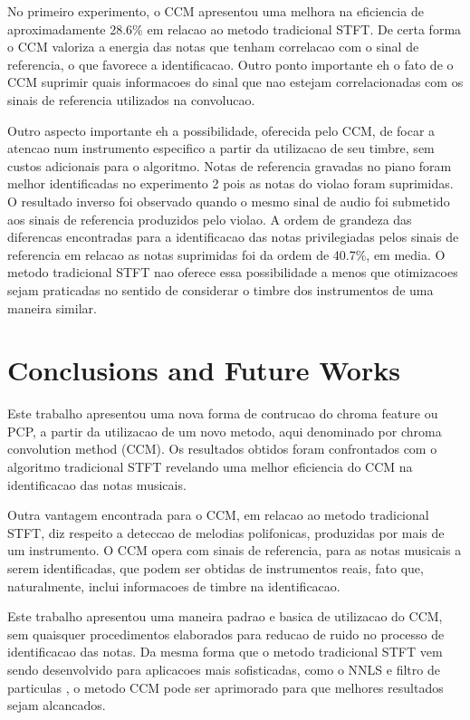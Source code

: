 \documentclass{article}
\begin{document}
	No primeiro experimento, o CCM apresentou uma melhora na eficiencia de aproximadamente 28.6\% em relacao ao metodo tradicional STFT. De certa forma o CCM valoriza a energia das notas que tenham correlacao com o sinal de referencia, o que favorece a identificacao. Outro ponto importante eh o fato de o CCM suprimir quais informacoes do sinal que nao estejam correlacionadas com os sinais de referencia utilizados na convolucao. 

	Outro aspecto importante eh a possibilidade, oferecida pelo CCM, de focar a atencao num instrumento especifico a partir da utilizacao de seu timbre, sem custos adicionais para o algoritmo. Notas de referencia gravadas no piano foram melhor identificadas no experimento 2 pois as notas do violao foram suprimidas. O resultado inverso foi observado quando o mesmo sinal de audio foi submetido aos sinais de referencia produzidos pelo violao. A ordem de grandeza das diferencas encontradas para a identificacao das notas privilegiadas pelos sinais de referencia em relacao as notas suprimidas foi da ordem de 40.7\%, em media. O metodo tradicional STFT nao oferece essa possibilidade a menos que otimizacoes sejam praticadas no sentido de considerar o timbre dos instrumentos de uma maneira similar.


	\section{Conclusions and Future Works}\label{sec:conclusions}

	Este trabalho apresentou uma nova forma de contrucao do chroma feature ou PCP, a partir da utilizacao de um novo metodo, aqui denominado por chroma convolution method (CCM). Os resultados obtidos foram confrontados com o algoritmo tradicional STFT revelando uma melhor eficiencia do CCM na identificacao das notas musicais.

	Outra vantagem encontrada para o CCM, em relacao ao metodo tradicional STFT, diz respeito a deteccao de melodias polifonicas, produzidas por mais de um instrumento. O CCM opera com sinais de referencia, para as notas musicais a serem identificadas, que podem ser obtidas de instrumentos reais, fato que, naturalmente, inclui informacoes de timbre na identificacao.

	Este trabalho apresentou uma maneira padrao e basica de utilizacao do CCM, sem quaisquer procedimentos elaborados para reducao de ruido no processo de identificacao das notas. Da mesma forma que o metodo tradicional STFT vem sendo desenvolvido para aplicacoes mais sofisticadas, como o NNLS \cite{mauch2010approximate} e filtro de particulas \cite{jo2010melody}, o metodo CCM pode ser aprimorado para que melhores resultados sejam alcancados.
	
\end{document}
